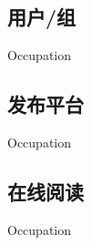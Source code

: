 
\subsection{用户/组}
\indent
Occupation

\subsection{发布平台}
\indent
Occupation

\subsection{在线阅读}
\indent
Occupation